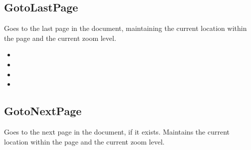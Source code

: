 \documentclass[letterpaper,12pt,english,openany,oneside]{sphinxmanual}
\begin{document}
\subsection{GotoLastPage}
\label{\detokenize{IAC_API_OLE_Objects:gotolastpage}}
Goes to the last page in the document, maintaining the current location within the page and the current zoom level.


\begin{sphinxVerbatim}[commandchars=\\\{\}]
 
\end{sphinxVerbatim}
\label{\detokenize{IAC_API_OLE_Objects:related-methods-137}}
\begin{itemize}
\item {} 
 

\item {} 
 

\item {} 
 

\item {} 
 

\end{itemize}




\subsection{GotoNextPage}
\label{\detokenize{IAC_API_OLE_Objects:gotonextpage}}
Goes to the next page in the document, if it exists. Maintains the current location within the page and the current zoom level.

\end{document}
